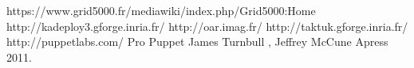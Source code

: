 \documentclass[a4paper, 10pt, onecolumn]{report}
\begin{document}
\begin{thebibliography}{99}
 https://www.grid5000.fr/mediawiki/index.php/Grid5000:Home
 http://kadeploy3.gforge.inria.fr/
 http://oar.imag.fr/
 http://taktuk.gforge.inria.fr/
 http://puppetlabs.com/
        Pro Puppet
		James Turnbull , Jeffrey McCune 
        Apress
        2011.


          
\end{thebibliography}
\end{document}
